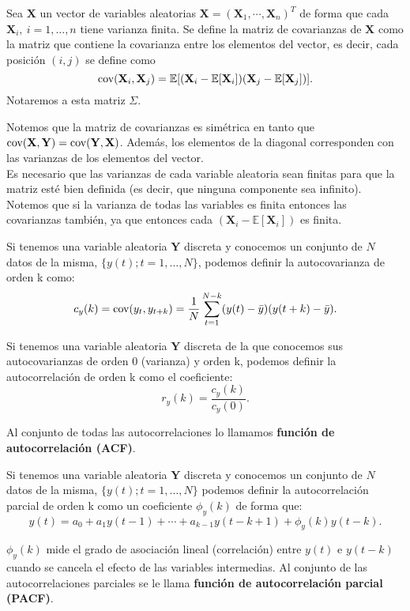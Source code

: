 \begin{definicion}
	Sea $\mathbf{X}$ un vector de variables aleatorias $\mathbf{X}=(\mathbf{X}_1, \cdots, \mathbf{X}_n)^T$ de forma que cada $\mathbf{X}_i,\ i=1, \dots, n$ tiene varianza finita. Se define la matriz de covarianzas de $\mathbf{X}$ como la matriz que contiene la covarianza entre los elementos del vector, es decir, cada posición $(i,j)$ se define como 
	\[ \text{cov}{(\mathbf{X}_i, \mathbf{X}_j)} = \mathbb{E}[(\mathbf{X}_i - \mathbb{E}[\mathbf{X}_i])(\mathbf{X}_j - \mathbb{E}[\mathbf{X}_j])].	\]
	Notaremos a esta matriz $\Sigma$.
\end{definicion}

Notemos que la matriz de covarianzas es simétrica en tanto que $\text{cov}{(\mathbf{X}, \mathbf{Y})} = \text{cov}{(\mathbf{Y}, \mathbf{X})}$. Además, los elementos de la diagonal corresponden con las varianzas de los elementos del vector.\\

Es necesario que las varianzas de cada variable aleatoria sean finitas para que la matriz esté bien definida (es decir, que ninguna componente sea infinito). Notemos que si la varianza de todas las variables es finita entonces las covarianzas también, ya que entonces cada $(\mathbf{X}_i - \mathbb{E}[\mathbf{X}_i])$ es finita.

\begin{definicion}
Si tenemos una variable aleatoria $\mathbf{Y}$ discreta y conocemos un conjunto de $N$ datos de la misma, $\{y(t); t=1,\dots,N\}$, podemos definir la autocovarianza de orden k como:
\[	c_y(k) = \text{cov}{(y_t, y_{t+k})} = \frac{1}{N} \sum_{t=1}^{N-k}(y(t)-\bar{y})(y(t+k)-\bar{y}).	\]
\end{definicion}

\begin{definicion}
Si tenemos una variable aleatoria $\mathbf{Y}$ discreta de la que conocemos sus autocovarianzas de orden 0 (varianza) y orden k, podemos definir la autocorrelación de orden k como el coeficiente:
\[	r_y(k) = \frac{c_y(k)}{c_y(0)}.	\]

Al conjunto de todas las autocorrelaciones lo llamamos \textbf{función de autocorrelación (ACF)}.
\end{definicion}

\begin{definicion}
Si tenemos una variable aleatoria $\mathbf{Y}$ discreta y conocemos un conjunto de $N$ datos de la misma, $\{y(t); t=1,\dots,N\}$ podemos definir la autocorrelación parcial de orden k como un coeficiente $\phi_y(k)$ de forma que:
\[	y(t) = a_0 + a_1y(t-1)+\cdots + a_{k-1}y(t-k+1) + \phi_y(k)y(t-k).	\]

$\phi_y(k)$ mide el grado de asociación lineal (correlación) entre $y(t)$ e $y(t-k)$ cuando se cancela el efecto de las variables intermedias. Al conjunto de las autocorrelaciones parciales se le llama \textbf{función de autocorrelación parcial (PACF)}.
\end{definicion}

